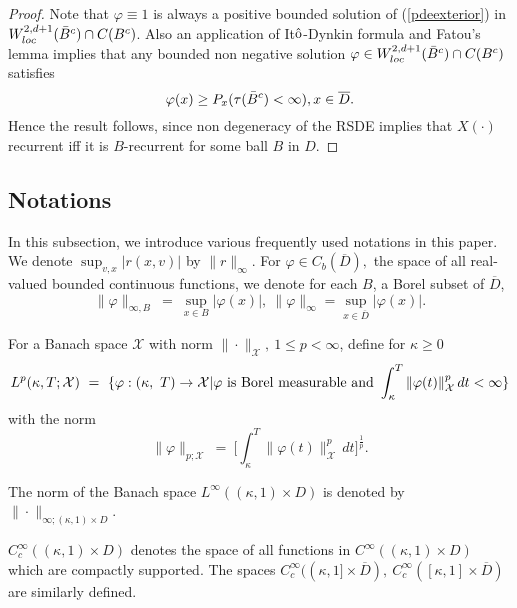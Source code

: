 \documentclass[11pt]{amsart}
\numberwithin{equation}{section}
\begin{document}
\begin{proof} Note that $\varphi \equiv 1$ is always a positive bounded solution of (\ref{pdeexterior}) in 
$W^{2, d +1}_{loc} (\Bar{B}^c) \cap C(B^c)$. Also an application of It$\hat{\rm o}$-Dynkin formula 
and Fatou's lemma implies that any bounded non negative solution  
$\varphi \in W^{2, d +1}_{loc} (\Bar{B}^c) \cap C(B^c)$ satisfies
\[
\varphi (x) \geq P_x (\tau(\Bar{B}^c ) < \infty ) ,  x \in \overline{D}.
\]
Hence the result follows, since non degeneracy of the RSDE implies that $X(\cdot) $ recurrent iff 
it is $B$-recurrent for some ball  $B$ in $D$. 

\end{proof} 


\subsection{Notations} In this subsection, we introduce  various frequently used notations in this
paper. 
We denote $\displaystyle{ \sup_{v,  x} |r(x, v)|}$ by $\|r\|_{\infty}.$
For $\varphi \in C_b(\overline{D}),$ the space of all real-valued  bounded continuous functions,
we denote for each $B$, a Borel subset of $\overline{D}$,
\[
\| \varphi \|_{\infty, B} \ = \ \sup_{x \in B} | \varphi (x)|, \ \|\varphi\|_{\infty} = \sup_{x \in \overline{D}}
| \varphi(x)|.
\]


For a Banach space $\mathcal{X}$ with norm $\| \cdot \|_{\mathcal{X}}, \ 1 \leq p <\infty$, define
for $\kappa \geq 0$
\[
L^p( \kappa, T ; \mathcal{X}) \ = \ \{ \varphi : (\kappa  , \ T) \to \mathcal{X} |  \varphi 
\ {\rm is\ Borel\ measurable\ and} \ \int^T_{\kappa} \| \varphi (t) \|^p _{\mathcal{X}} \, dt  < \infty \}
\]
with the norm 
\[
\|\varphi\|_{p; \mathcal{X}} \ = \ \Big[ \int^T_{\kappa} \|\varphi (t) \|^p_{\mathcal{X}} \, dt 
\Big]^{\frac{1}{p}}.
\]

The norm of the Banach space ${L^\infty ((\kappa, 1) \times D)}$ is denoted by 
$\| \cdot\|_{\infty ; (\kappa, 1) \times D}$. 

 $ C^{\infty}_c ( (\kappa, 1) \times D)$  denotes  the space of all functions in 
$C^{\infty} ((\kappa, 1) \times D)$  which are compactly supported. The spaces 
$ C^{\infty}_c ( (\kappa, 1] \times \overline{D}), \  C^{\infty}_c ( [\kappa, 1] \times \overline{D})$
are similarly defined. 
\end{document}

